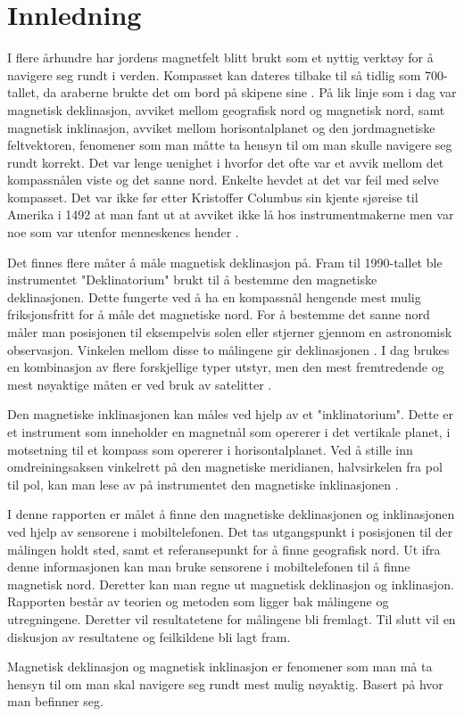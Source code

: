 \section{Innledning}

I flere århundre har jordens magnetfelt blitt brukt som et nyttig verktøy for å navigere seg rundt i verden. Kompasset kan dateres tilbake til så tidlig som 700-tallet, da araberne brukte det om bord på skipene sine \cite{kompass}. På lik linje som i dag var magnetisk deklinasjon, avviket mellom geografisk nord og magnetisk nord, samt magnetisk inklinasjon, avviket mellom horisontalplanet og den jordmagnetiske feltvektoren, fenomener som man måtte ta hensyn til om man skulle navigere seg rundt korrekt. Det var lenge uenighet i hvorfor det ofte var et avvik mellom det kompassnålen viste og det sanne nord. Enkelte hevdet at det var feil med selve kompasset. Det var ikke før etter Kristoffer Columbus sin kjente sjøreise til Amerika i 1492 at man fant ut at avviket ikke lå hos instrumentmakerne men var noe som var utenfor menneskenes hender \cite{kompass}. 

Det finnes flere måter å måle magnetisk deklinasjon på. Fram til 1990-tallet ble instrumentet "Deklinatorium" brukt til å bestemme den magnetiske deklinasjonen. Dette fungerte ved å ha en kompassnål hengende mest mulig friksjonsfritt for å måle det magnetiske nord. For å bestemme det sanne nord måler man posisjonen til eksempelvis solen eller stjerner gjennom en astronomisk observasjon. Vinkelen mellom disse to målingene gir deklinasjonen \cite{deklinatorium}. I dag brukes en kombinasjon av flere forskjellige typer utstyr, men den mest fremtredende og mest nøyaktige måten er ved bruk av satelitter \cite{World_magnetic_model}.    

Den magnetiske inklinasjonen kan måles ved hjelp av et "inklinatorium". Dette er et instrument som inneholder en magnetnål som opererer i det vertikale planet, i motsetning til et kompass som opererer i horisontalplanet. Ved å stille inn omdreiningsaksen vinkelrett på den magnetiske meridianen, halvsirkelen fra pol til pol, kan man lese av på instrumentet den magnetiske inklinasjonen \cite{inklinometer}. 

I denne rapporten er målet å finne den magnetiske deklinasjonen og inklinasjonen ved hjelp av sensorene i mobiltelefonen. Det tas utgangspunkt i posisjonen til der målingen holdt sted, samt et referansepunkt for å finne geografisk nord. Ut ifra denne informasjonen kan man bruke sensorene i mobiltelefonen til å finne magnetisk nord. Deretter kan man regne ut magnetisk deklinasjon og inklinasjon. Rapporten består av teorien og metoden som ligger bak målingene og utregningene. Deretter vil resultatetene for målingene bli fremlagt. Til slutt vil en diskusjon av resultatene og feilkildene bli lagt fram.

Magnetisk deklinasjon og magnetisk inklinasjon er fenomener som man må ta hensyn til om man skal navigere seg rundt mest mulig nøyaktig. Basert på hvor man befinner seg.  